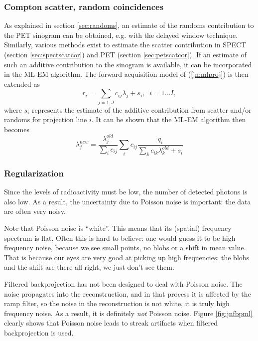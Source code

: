 \documentclass[11pt,oneside]{article}
\begin{document}
\subsubsection{Compton scatter, random coincidences}
As explained in section \ref{sec:randoms}, an estimate of the randoms
contribution to the PET sinogram can be obtained, e.g. with the
delayed window technique. Similarly, various methods exist to estimate
the scatter contribution in SPECT (section \ref{sec:spectscatcor})
and PET (section \ref{sec:petscatcor}). If an estimate of such an
additive contribution to the sinogram is available, it can be
incorporated in the ML-EM algorithm. The forward acquisition model
of (\ref{jn:mlproj}) is then extended as 
\begin{equation}
  r_i = \sum_{j=1,J} c_{ij} \lambda_j + s_i, \;\; i = 1 \ldots I,
  \label{jn:mlprojscat}
\end{equation}
where $s_i$ represents the estimate of the additive contribution from
scatter and/or randoms for projection line $i$. It can be shown that
the ML-EM algorithm then becomes
\begin{equation}
  \lambda_j^{new}  =  \frac{\lambda_j^{old}}{\sum_i c_{ij}}
           \sum_i c_{ij}  \frac{q_i}{\sum_k c_{ik} \lambda_k^{old} + s_i}
           \label{eq:jnmlemscat}
\end{equation}



\subsubsection{Regularization} \label{sec:regularization}
Since the levels of radioactivity must be low, the number of detected photons
is also low. As a result, the uncertainty due to Poisson noise is important:
the data are often very noisy. 

Note that Poisson noise is ``white''. This means that its (spatial) frequency
spectrum is flat. Often this is hard to believe: one would guess it to be high
frequency noise, because we see small points, no blobs or a shift in mean
value.  That is because our eyes are very good at picking up high frequencies:
the blobs and the shift are there all right, we just don't see them.

Filtered backprojection has not been designed to deal with Poisson
noise. The noise propagates into the reconstruction, and in that
process it is affected by the ramp filter, so the noise in the
reconstruction is not white, it is truly high frequency noise. As a
result, it is definitely {\em not} Poisson noise. Figure
\ref{fig:jnfbpml} clearly shows that Poisson noise leads to streak
artifacts when filtered backprojection is used.
\end{document}
